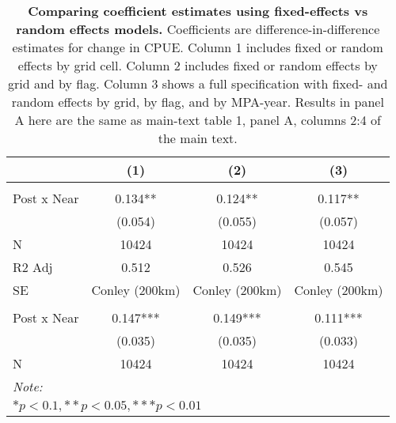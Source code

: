 \begin{table}

\caption{\label{tab:fe_vs_re}\textbf{Comparing coefficient estimates using fixed-effects vs random effects models.}
             Coefficients are difference-in-difference estimates for change in CPUE.
             Column 1 includes fixed or random effects by grid cell. Column 2 includes fixed or random
             effects by grid and by flag. Column 3 shows a full specification with fixed- and random effects by grid, by
             flag, and by MPA-year. Results in panel A here are the same as main-text table 1, panel A, columns 2:4 of the main text.}
\centering
\begin{tabular}[t]{lccc}
\toprule
  & (1) & (2) & (3)\\
\midrule
\addlinespace[0.3em]
\multicolumn{4}{l}{Panel A:}\\
\hspace{1em}Post x Near & 0.134** & 0.124** & 0.117**\\
\hspace{1em} & (0.054) & (0.055) & (0.057)\\
\hspace{1em}N & 10424 & 10424 & \vphantom{1} 10424\\
\hspace{1em}R2 Adj & 0.512 & 0.526 & 0.545\\
\hspace{1em}SE & Conley (200km) & Conley (200km) & Conley (200km)\\
\addlinespace[0.5cm]
\multicolumn{4}{l}{Panel B:}\\
\hspace{1em}Post x Near & 0.147*** & 0.149*** & 0.111***\\
\hspace{1em} & (0.035) & (0.035) & (0.033)\\
\hspace{1em}N & 10424 & 10424 & 10424\\
\midrule
\midrule
\bottomrule
\multicolumn{4}{l}{\rule{0pt}{1em}\textit{Note: }}\\
\multicolumn{4}{l}{\rule{0pt}{1em}$* p < 0.1, ** p < 0.05, *** p < 0.01$}\\
\end{tabular}
\end{table}